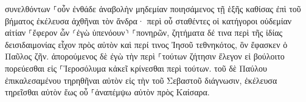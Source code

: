 \documentclass{openreader}
\begin{document}
συνελθόντων ⸀οὖν ἐνθάδε ἀναβολὴν μηδεμίαν ποιησάμενος τῇ ἑξῆς καθίσας ἐπὶ τοῦ βήματος ἐκέλευσα ἀχθῆναι τὸν ἄνδρα· 
περὶ οὗ σταθέντες οἱ κατήγοροι οὐδεμίαν αἰτίαν ⸀ἔφερον ὧν ⸂ἐγὼ ὑπενόουν⸃ ⸀πονηρῶν, 
ζητήματα δέ τινα περὶ τῆς ἰδίας δεισιδαιμονίας εἶχον πρὸς αὐτὸν καὶ περί τινος Ἰησοῦ τεθνηκότος, ὃν ἔφασκεν ὁ Παῦλος ζῆν. 
ἀπορούμενος δὲ ἐγὼ τὴν περὶ ⸀τούτων ζήτησιν ἔλεγον εἰ βούλοιτο πορεύεσθαι εἰς ⸀Ἱεροσόλυμα κἀκεῖ κρίνεσθαι περὶ τούτων. 
τοῦ δὲ Παύλου ἐπικαλεσαμένου τηρηθῆναι αὐτὸν εἰς τὴν τοῦ Σεβαστοῦ διάγνωσιν, ἐκέλευσα τηρεῖσθαι αὐτὸν ἕως οὗ ⸀ἀναπέμψω αὐτὸν πρὸς Καίσαρα. 
\end{document}
